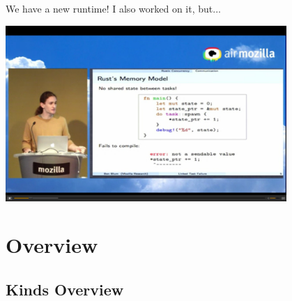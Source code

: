 \documentclass[xcolor=dvipsnames]{beamer}
\begin{document}
\begin{frame}{We have a new runtime!}
	I also worked on it, but... \\
	\pause
	\begin{center}
		\includegraphics[width=0.8\textwidth]{last-year.png}
	\end{center}
\end{frame}

\section{Overview}

\newcommand\code[1]{{\begin{center}\fbox{\begin{tabular}{l} #1 \end{tabular}} \end{center}}}



\subsection{Kinds Overview}
\end{document}
